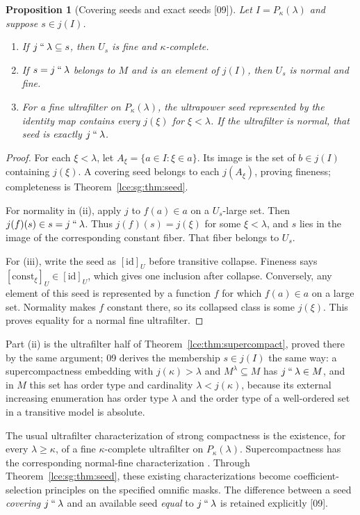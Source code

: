 \documentclass[11pt,letterpaper]{article}
\numberwithin{equation}{section}
\newtheorem{proposition}[theorem]{Proposition}
\theoremstyle{definition}
\theoremstyle{remark}
\newcommand{\imset}[2]{#1\mathbin{``}#2}
\newcommand{\thref}[1]{Theorem~\ref{#1}}
\newcommand{\src}[1]{\textup{\textsf{\small[#1]}}}%
\begin{document}
\begin{proposition}[Covering seeds and exact seeds \src{09}]\label{lce:sg:prop:fine}
Let $I=P_\kappa(\lambda)$ and suppose $s\in j(I)$.
\begin{enumerate}[label=\textup{(\roman*)}]
\item If $\imset j\lambda\subseteq s$, then $U_s$ is fine and
$\kappa$-complete.
\item If $s=\imset j\lambda$ belongs to $M$ and is an element of $j(I)$,
then $U_s$ is normal and fine.
\item For a fine ultrafilter on $P_\kappa(\lambda)$, the ultrapower seed
represented by the identity map contains every $j(\xi)$ for $\xi<\lambda$.
If the ultrafilter is normal, that seed is exactly $\imset j\lambda$.
\end{enumerate}
\end{proposition}
\begin{proof}
For each $\xi<\lambda$, let $A_\xi=\{a\in I:\xi\in a\}$. Its image is the
set of $b\in j(I)$ containing $j(\xi)$. A covering seed belongs to each
$j(A_\xi)$, proving fineness; completeness is \thref{lce:sg:thm:seed}.

For normality in (ii), apply $j$ to $f(a)\in a$ on a $U_s$-large set. Then
$j(f)(s)\in s=\imset j\lambda$. Thus $j(f)(s)=j(\xi)$ for some $\xi<\lambda$,
and $s$ lies in the image of the corresponding constant fiber. That fiber
belongs to $U_s$.

For (iii), write the seed as $[\mathrm{id}]_U$ before transitive collapse.
Fineness says $[\mathrm{const}_\xi]_U\in[\mathrm{id}]_U$, which gives one
inclusion after collapse. Conversely, any element of this seed is
represented by a function $f$ for which $f(a)\in a$ on a large set.
Normality makes $f$ constant there, so its collapsed class is some
$j(\xi)$. This proves equality for a normal fine ultrafilter.
\end{proof}
Part (ii) is the ultrafilter half of \thref{lce:thm:supercompact}, proved
there by the same argument; 09 derives the membership $s\in j(I)$ the same
way: a supercompactness embedding with $j(\kappa)>\lambda$ and
$M^\lambda\subseteq M$ has $\imset j\lambda\in M$, and in $M$ this set has
order type and cardinality $\lambda<j(\kappa)$, because its external
increasing enumeration has order type $\lambda$ and the order type of a
well-ordered set in a transitive model is absolute.

The usual ultrafilter characterization of strong compactness is the
existence, for every $\lambda\ge\kappa$, of a fine $\kappa$-complete
ultrafilter on $P_\kappa(\lambda)$. Supercompactness has the corresponding
normal-fine characterization \cite{Kanamori}. Through
\thref{lce:sg:thm:seed}, these existing characterizations become
coefficient-selection principles on the specified omnific masks. The
difference between a seed \emph{covering} $\imset j\lambda$ and an available
seed \emph{equal} to $\imset j\lambda$ is retained explicitly \src{09}.
\end{document}
